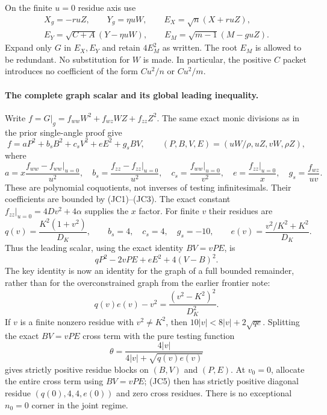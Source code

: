 On the finite $u=0$ residue axis use
\begin{gather*}
 X_g=-ruZ,\qquad Y_g=\eta uW,\qquad E_X=\sqrt n(X+ruZ),\\
 E_Y=\sqrt{C+A}(Y-\eta uW),\qquad
 E_M=\sqrt{m-1}(M-guZ).                              \tag{JC4}
\end{gather*}
Expand only $G$ in $E_X,E_Y$ and retain $4E_M^2$ as written.
The root $E_M$ is allowed to be redundant.  No substitution for
$W$ is made.  In particular, the positive $C$ packet introduces
no coefficient of the form $Cu^2/n$ or $Cu^2/m$.

\paragraph{The complete graph scalar and its global leading inequality.}
Write $f=G|_g=f_{ww}W^2+f_{wz}WZ+f_{zz}Z^2$.  The same exact monic
divisions as in the prior single-angle proof give
\[
 f=aP^2+b_sB^2+c_sV^2+eE^2+g_sBV,
 \qquad (P,B,V,E)=(uW/\rho,uZ,vW,\rho Z),              \tag{JC5}
\]
where
\[
 a=x\frac{f_{ww}-f_{ww}|_{u=0}}{u^2},\quad
 b_s=\frac{f_{zz}-f_{zz}|_{u=0}}{u^2},\quad
 c_s=\frac{f_{ww}|_{u=0}}{v^2},\quad
 e=\frac{f_{zz}|_{u=0}}x,\quad g_s=\frac{f_{wz}}{uv}.
\]
These are polynomial coquotients, not inverses of testing
infinitesimals.  Their coefficients are bounded by (JC1)--(JC3).
The exact constant $f_{zz}|_{u=0}=4Dv^2+4\alpha$ supplies the $x$
factor.  For finite $v$ their residues are
\[
 q(v)=\frac{K^2(1+v^2)}{D_K},\qquad
 b_s=4,\quad c_s=4,\quad g_s=-10,\qquad
 e(v)=\frac{v^2/K^2+K^2}{D_K}.                        \tag{JC6}
\]
Thus the leading scalar, using the exact identity $BV=vPE$, is
\[
                  qP^2-2vPE+eE^2+4(V-B)^2.           \tag{JC7}
\]
The key identity is now an identity for the graph of a full
bounded remainder, rather than for the overconstrained graph from
the earlier frontier note:
\[
                   q(v)e(v)-v^2
                    =\frac{(v^2-K^2)^2}{D_K^2}.      \tag{JC8}
\]
If $v$ is a finite nonzero residue with $v^2\ne K^2$, then
$10|v|<8|v|+2\sqrt{qe}$.  Splitting the exact $BV=vPE$ cross
term with the pure testing function
\[
             \theta=\frac{4|v|}{4|v|+\sqrt{q(v)e(v)}}
\]
gives strictly positive residue blocks on $(B,V)$ and $(P,E)$.
At $v_0=0$, allocate the entire cross term using $BV=vPE$;
(JC5) then has strictly positive diagonal residue
$(q(0),4,4,e(0))$ and zero cross residues.  There is no exceptional
$n_0=0$ corner in the joint regime.

